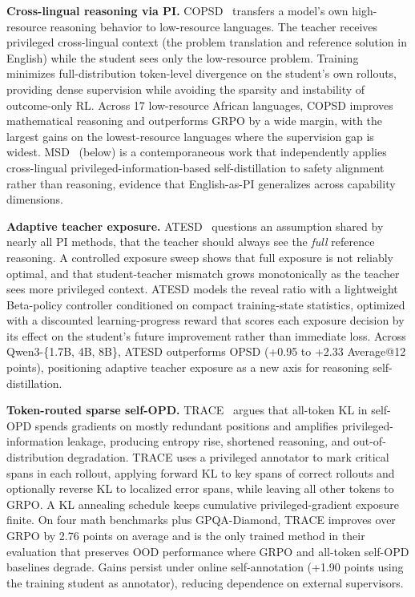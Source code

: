 \documentclass{article} %
\begin{document}
\textbf{Cross-lingual reasoning via PI.} COPSD~\citep{2605.09548} transfers a model's own high-resource reasoning behavior to low-resource languages. The teacher receives privileged cross-lingual context (the problem translation and reference solution in English) while the student sees only the low-resource problem. Training minimizes full-distribution token-level divergence on the student's own rollouts, providing dense supervision while avoiding the sparsity and instability of outcome-only RL. Across 17 low-resource African languages, COPSD improves mathematical reasoning and outperforms GRPO by a wide margin, with the largest gains on the lowest-resource languages where the supervision gap is widest. MSD~\citep{2605.02971} (below) is a contemporaneous work that independently applies cross-lingual privileged-information-based self-distillation to safety alignment rather than reasoning, evidence that English-as-PI generalizes across capability dimensions.

\textbf{Adaptive teacher exposure.} ATESD~\citep{2605.11458} questions an assumption shared by nearly all PI methods, that the teacher should always see the \emph{full} reference reasoning. A controlled exposure sweep shows that full exposure is not reliably optimal, and that student-teacher mismatch grows monotonically as the teacher sees more privileged context. ATESD models the reveal ratio with a lightweight Beta-policy controller conditioned on compact training-state statistics, optimized with a discounted learning-progress reward that scores each exposure decision by its effect on the student's future improvement rather than immediate loss. Across Qwen3-\{1.7B, 4B, 8B\}, ATESD outperforms OPSD (+0.95 to +2.33 Average@12 points), positioning adaptive teacher exposure as a new axis for reasoning self-distillation.

\textbf{Token-routed sparse self-OPD.} TRACE~\citep{2605.10194} argues that all-token KL in self-OPD spends gradients on mostly redundant positions and amplifies privileged-information leakage, producing entropy rise, shortened reasoning, and out-of-distribution degradation. TRACE uses a privileged annotator to mark critical spans in each rollout, applying forward KL to key spans of correct rollouts and optionally reverse KL to localized error spans, while leaving all other tokens to GRPO. A KL annealing schedule keeps cumulative privileged-gradient exposure finite. On four math benchmarks plus GPQA-Diamond, TRACE improves over GRPO by 2.76 points on average and is the only trained method in their evaluation that preserves OOD performance where GRPO and all-token self-OPD baselines degrade. Gains persist under online self-annotation (+1.90 points using the training student as annotator), reducing dependence on external supervisors.
\end{document}
